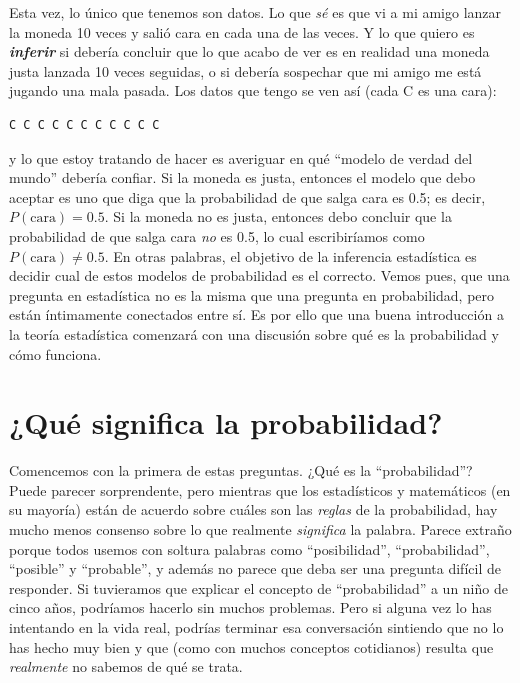 \documentclass[spanish,]{book}
\begin{document}
Esta vez, lo único que tenemos son datos. Lo que \emph{sé} es que vi a
mi amigo lanzar la moneda 10 veces y salió cara en cada una de las
veces. Y lo que quiero es \textbf{\emph{inferir}} si debería concluir
que lo que acabo de ver es en realidad una moneda justa lanzada 10 veces
seguidas, o si debería sospechar que mi amigo me está jugando una mala
pasada. Los datos que tengo se ven así (cada C es una cara):

\begin{verbatim}
C C C C C C C C C C C
\end{verbatim}

y lo que estoy tratando de hacer es averiguar en qué ``modelo de verdad
del mundo'' debería confiar. Si la moneda es justa, entonces el modelo
que debo aceptar es uno que diga que la probabilidad de que salga cara
es 0.5; es decir, \(P(\mbox{cara}) = 0.5\). Si la moneda no es justa,
entonces debo concluir que la probabilidad de que salga cara \emph{no}
es 0.5, lo cual escribiríamos como \(P(\mbox{cara}) \neq 0.5\). En otras
palabras, el objetivo de la inferencia estadística es decidir cual de
estos modelos de probabilidad es el correcto. Vemos pues, que una
pregunta en estadística no es la misma que una pregunta en probabilidad,
pero están íntimamente conectados entre sí. Es por ello que una buena
introducción a la teoría estadística comenzará con una discusión sobre
qué es la probabilidad y cómo funciona.

\section{¿Qué significa la probabilidad?}\label{probmeaning}

Comencemos con la primera de estas preguntas. ¿Qué es la
``probabilidad''? Puede parecer sorprendente, pero mientras que los
estadísticos y matemáticos (en su mayoría) están de acuerdo sobre cuáles
son las \emph{reglas} de la probabilidad, hay mucho menos consenso sobre
lo que realmente \emph{significa} la palabra. Parece extraño porque
todos usemos con soltura palabras como ``posibilidad'',
``probabilidad'', ``posible'' y ``probable'', y además no parece que
deba ser una pregunta difícil de responder. Si tuvieramos que explicar
el concepto de ``probabilidad'' a un niño de cinco años, podríamos
hacerlo sin muchos problemas. Pero si alguna vez lo has intentando en la
vida real, podrías terminar esa conversación sintiendo que no lo has
hecho muy bien y que (como con muchos conceptos cotidianos) resulta que
\emph{realmente} no sabemos de qué se trata.
\end{document}
